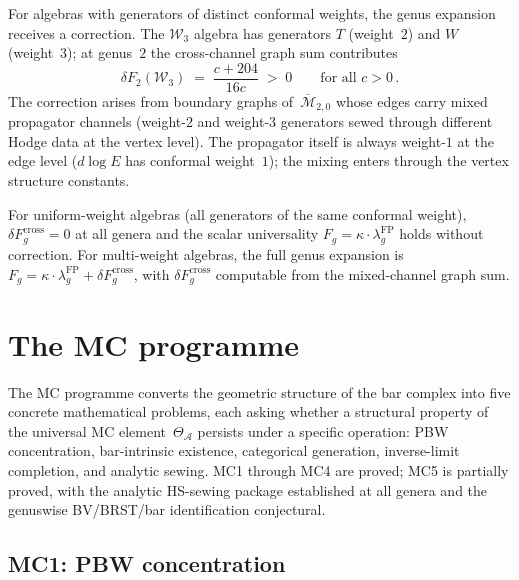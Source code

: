 \documentclass[11pt,reqno]{amsart}
\theoremstyle{definition}
\theoremstyle{remark}
\providecommand{\cA}{\mathcal{A}}
\providecommand{\cM}{\mathcal{M}}
\providecommand{\cW}{\mathcal{W}}
\numberwithin{equation}{section}
\begin{document}
For algebras with generators of distinct conformal
weights, the genus expansion
receives a correction. The $\cW_3$ algebra has generators
$T$ (weight~$2$) and $W$ (weight~$3$); at genus~$2$ the
cross-channel graph sum contributes
\begin{equation}\label{eq:delta-f2-w3}
\delta F_2(\cW_3)
\;=\;
\frac{c + 204}{16c}
\;>\; 0
\qquad
\text{for all } c > 0\,.
\end{equation}
The correction arises from boundary graphs
of~$\overline{\cM}_{2,0}$ whose edges carry mixed
propagator channels (weight-$2$ and weight-$3$ generators
sewed through different Hodge data at the vertex level).
The propagator itself is always weight-$1$ at the edge
level ($d\log E$ has conformal weight~$1$); the mixing
enters through the vertex structure constants.

For uniform-weight algebras (all generators of the same
conformal weight), $\delta F_g^{\mathrm{cross}} = 0$
at all genera and the scalar universality
$F_g = \kappa \cdot \lambda_g^{\mathrm{FP}}$ holds
without correction. For multi-weight algebras, the
full genus expansion is
$F_g = \kappa \cdot \lambda_g^{\mathrm{FP}}
+ \delta F_g^{\mathrm{cross}}$,
with
$\delta F_g^{\mathrm{cross}}$ computable from the
mixed-channel graph sum.


\section{The MC programme}
\label{sec:mc-programme}

The MC programme converts the geometric structure of the
bar complex into five concrete mathematical problems, each
asking whether a structural property of the universal MC
element~$\Theta_\cA$ persists under a specific operation:
PBW concentration, bar-intrinsic existence, categorical
generation, inverse-limit completion, and analytic sewing.
MC1 through MC4 are proved; MC5 is partially proved, with
the analytic HS-sewing package established at all genera
and the genuswise BV/BRST/bar identification conjectural.

\subsection{MC1: PBW concentration}
\label{ssec:mc1}
\end{document}
